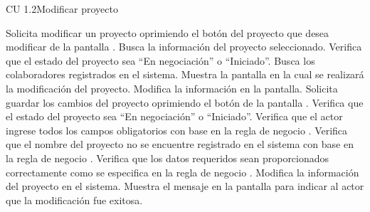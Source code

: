 \begin{UseCase}{CU 1.2}{Modificar proyecto}

\end{UseCase}
 \begin{UCtrayectoria}
    \UCpaso[\UCactor] Solicita modificar un proyecto oprimiendo el botón \btnEditar del proyecto que desea modificar de la pantalla .
    \UCpaso[\UCsist] Busca la información del proyecto seleccionado.
    \UCpaso[\UCsist] Verifica que el estado del proyecto sea ``En negociación'' o ``Iniciado''. 
    \UCpaso[\UCsist] Busca los colaboradores registrados en el sistema.
    \UCpaso[\UCsist] Muestra la pantalla  en la cual se realizará la modificación del proyecto. 
    \UCpaso[\UCactor] Modifica la información en la pantalla. \label{cu1.2:ingresaDatos}
    \UCpaso[\UCactor] Solicita guardar los cambios del proyecto oprimiendo el botón  de la pantalla .  
    \UCpaso[\UCsist] Verifica que el estado del proyecto sea ``En negociación'' o ``Iniciado''. 
    \UCpaso[\UCsist] Verifica que el actor ingrese todos los campos obligatorios con base en la regla de negocio  . 
    \UCpaso[\UCsist] Verifica que el nombre del proyecto no se encuentre registrado en el sistema con base en la regla de negocio  . 
    \UCpaso[\UCsist] Verifica que los datos requeridos sean proporcionados correctamente como se especifica en la regla de negocio .  
    \UCpaso[\UCsist] Modifica la información del proyecto en el sistema. 
    \UCpaso[\UCsist] Muestra el mensaje  en la pantalla 
    para indicar al actor que la modificación fue exitosa.
 \end{UCtrayectoria}
